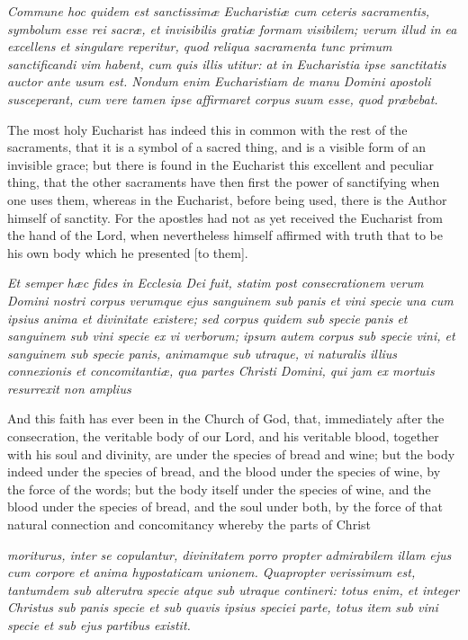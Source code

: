 \emph{Commune hoc quidem est sanctissimæ Eucharistiæ cum ceteris sacramentis, symbolum esse rei sacræ, et invisibilis gratiæ formam visibilem; verum illud in ea excellens et singulare reperitur, quod reliqua sacramenta tunc primum sanctificandi vim habent, cum quis illis utitur: at in Eucharistia ipse sanctitatis auctor ante usum est. Nondum enim Eucharistiam de manu Domini apostoli susceperant, cum vere tamen ipse affirmaret corpus suum esse, quod præbebat.}

The most holy Eucharist has indeed this in common with the rest of the sacraments, that it is a symbol of a sacred thing, and is a visible form of an invisible grace; but there is found in the Eucharist this excellent and peculiar thing, that the other sacraments have then first the power of sanctifying when one uses them, whereas in the Eucharist, before being used, there is the Author himself of sanctity. For the apostles had not as yet received the Eucharist from the hand of the Lord, when nevertheless himself affirmed with truth that to be his own body which he presented [to them].

\emph{Et semper hæc fides in Ecclesia Dei fuit, statim post consecrationem verum Domini nostri corpus verumque ejus sanguinem sub panis et vini specie una cum ipsius anima et divinitate existere; sed corpus quidem sub specie panis et sanguinem sub vini specie ex vi verborum; ipsum autem corpus sub specie vini, et sanguinem sub specie panis, animamque sub utraque, vi naturalis illius connexionis et concomitantiæ, qua partes Christi Domini, qui jam ex mortuis resurrexit non amplius }

And this faith has ever been in the Church of God, that, immediately after the consecration, the veritable body of our Lord, and his veritable blood, together with his soul and divinity, are under the species of bread and wine; but the body indeed under the species of bread, and the blood under the species of wine, by the force of the words; but the body itself under the species of wine, and the blood under the species of bread, and the soul under both, by the force of that natural connection and concomitancy whereby the parts of Christ

\emph{moriturus, inter se copulantur, divinitatem porro propter admirabilem illam ejus cum corpore et anima hypostaticam unionem. Quapropter verissimum est, tantumdem sub alterutra specie atque sub utraque contineri: totus enim, et integer Christus sub panis specie et sub quavis ipsius speciei parte, totus item sub vini specie et sub ejus partibus existit.}


